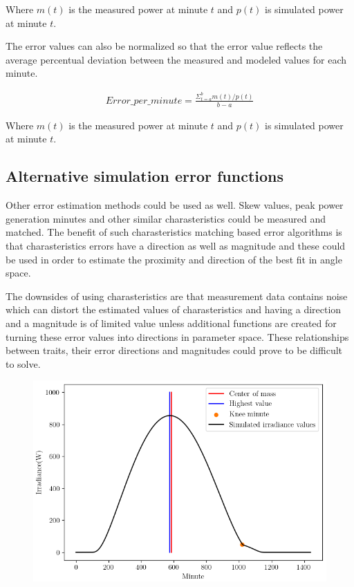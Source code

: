 \noindent Where $m(t)$ is the measured power at minute $t$ and $p(t)$ is simulated power at minute $t$.

\vspace{5mm}
\noindent The error values can also be normalized so that the error value reflects the average percentual deviation between the measured and modeled values for each minute.

\begin{align}
	Error\_per\_minute =  \frac{\Sigma_{t=a}^{b} m(t)/p(t)}{b-a} \label{areaerrorpercents}
\end{align}

\noindent Where $m(t)$ is the measured power at minute $t$ and $p(t)$ is simulated power at minute $t$.

\subsection{Alternative simulation error functions}
\noindent Other error estimation methods could be used as well. Skew values, peak power generation minutes and other similar charasteristics could be measured and matched. The benefit of such charasteristics matching based error algorithms is that charasteristics errors have a direction as well as magnitude and these could be used in order to estimate the proximity and direction of the best fit in angle space. 

The downsides of using charasteristics are that measurement data contains noise which can distort the estimated values of charasteristics and having a direction and a magnitude is of limited value unless additional functions are created for turning these error values into directions in parameter space. These relationships between traits, their error directions and magnitudes could prove to be difficult to solve.



\begin{figure}[h]
\centering
\includegraphics[width=0.5\linewidth]{pics/poa_charasteristics}
\label{fig_charasteristics}
\end{figure}




